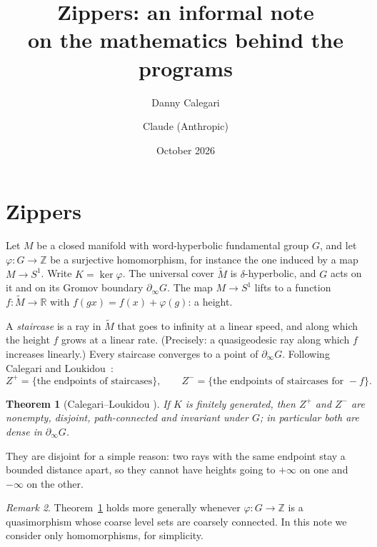 \documentclass[11pt]{article}
\title{Zippers: an informal note\\on the mathematics behind the programs}
\author{Danny Calegari \and Claude (Anthropic)}
\date{October 2026}
\newtheorem{theorem}{Theorem}[section]
\theoremstyle{remark}
\newtheorem{remark}[theorem]{Remark}
\newcommand{\Z}{\mathbb{Z}}
\newcommand{\R}{\mathbb{R}}
\begin{document}
\maketitle

\begin{center}
\end{center}

\section{Zippers}

Let $M$ be a closed manifold with word-hyperbolic fundamental group $G$, and let $\varphi\colon G\to\Z$ be a
surjective homomorphism, for instance the one induced by a map $M\to S^1$. Write $K=\ker\varphi$. The universal cover
$\widetilde M$ is $\delta$-hyperbolic, and $G$ acts on it and on its Gromov boundary $\partial_\infty G$. The map $M\to S^1$ lifts to a function $f\colon\widetilde M\to\R$ with $f(gx)=f(x)+\varphi(g)$: a height.

A \emph{staircase} is a ray in $\widetilde M$ that goes to infinity at a linear speed, and along which the height $f$
grows at a linear rate. (Precisely: a quasigeodesic ray along which $f$ increases linearly.) Every staircase converges to a
point of $\partial_\infty G$. Following Calegari and Loukidou~\cite{CL}:
\[
Z^+=\{\text{the endpoints of staircases}\},\qquad Z^-=\{\text{the endpoints of staircases for } -f\}.
\]

\begin{theorem}[Calegari--Loukidou \cite{CL}]\label{thm:CL}
If $K$ is finitely generated, then $Z^+$ and $Z^-$ are nonempty, disjoint, path-connected and invariant under
$G$; in particular both are dense in $\partial_\infty G$.
\end{theorem}

They are disjoint for a simple reason: two rays with the same endpoint stay a bounded distance apart, so they cannot have
heights going to $+\infty$ on one and $-\infty$ on the other.

\begin{remark}\label{rem:quasi}
Theorem~\ref{thm:CL} holds more generally whenever $\varphi\colon G\to\Z$ is a quasimorphism whose coarse level sets are coarsely
connected. In this note we consider only homomorphisms, for simplicity.
\end{remark}
\end{document}
